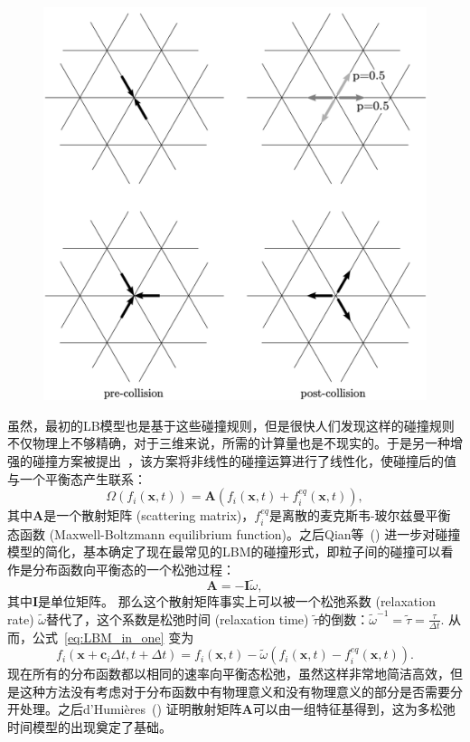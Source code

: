 \begin{figure}[htb]
    \centering
      \includegraphics[width=0.84\columnwidth]{figures/LGA_collision.png}
    \label{img:LGA_collision}
\end{figure}

虽然，最初的LB模型也是基于这些碰撞规则，但是很快人们发现这样的碰撞规则不仅物理上不够精确，对于三维来说，所需的计算量也是不现实的。于是另一种增强的碰撞方案被提出~\cite{higuera1989lattice, higuera1989boltzmann}，该方案将非线性的碰撞运算进行了线性化，使碰撞后的值与一个平衡态产生联系：
\begin{equation}
    \Omega(f_{i}(\mathbf{x}, t))=\mathbf{A}(f_{i}(\mathbf{x},t)+f_{i}^{eq}(\mathbf{x},t)),
\end{equation}
其中$\mathbf{A}$是一个散射矩阵 (scattering matrix)，$f_{i}^{eq}$是离散的麦克斯韦-玻尔兹曼平衡态函数 (Maxwell-Boltzmann equilibrium function)。之后Qian等~(\citeyear{qian1992lattice}) 进一步对碰撞模型的简化，基本确定了现在最常见的LBM的碰撞形式，即粒子间的碰撞可以看作是分布函数向平衡态的一个松弛过程：
\begin{equation}
    \mathbf{A}=-\mathbf{I}\tilde{\omega},
\end{equation}
其中$\mathbf{I}$是单位矩阵。
那么这个散射矩阵事实上可以被一个松弛系数 (relaxation rate) $\tilde{\omega}$替代了，这个系数是松弛时间 (relaxation time) $\tilde{\tau}$的倒数：$\tilde{\omega}^{-1}=\tilde{\tau}=\frac{\tau}{\Delta t}$. 从而，公式~\ref{eq:LBM_in_one} 变为
\begin{equation}
    f_{i}(\mathbf{x}+\mathbf{c}_i \Delta t,t+\Delta t)=f_{i}(\mathbf{x},t)-\tilde{\omega}(f_{i}(\mathbf{x},t)-f_{i}^{eq}(\mathbf{x},t)).
    \label{eq:LBM_in_one_BGK}
\end{equation}
现在所有的分布函数都以相同的速率向平衡态松弛，虽然这样非常地简洁高效，但是这种方法没有考虑对于分布函数中有物理意义和没有物理意义的部分是否需要分开处理。之后d'Humières~(\citeyear{d1992generalized}) 证明散射矩阵$\mathbf{A}$可以由一组特征基得到，这为多松弛时间模型的出现奠定了基础。

